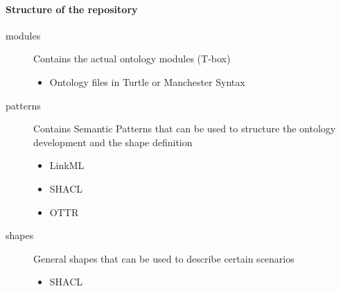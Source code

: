 \paragraph{Structure of the repository}

\begin{description}
    \item[modules] Contains the actual ontology modules (T-box)
    \begin{itemize}
        \item Ontology files in Turtle or Manchester Syntax
    \end{itemize}
    \item[patterns] Contains Semantic Patterns that can be used to structure the ontology development and the shape definition
    \begin{itemize}
        \item LinkML
        \item SHACL
        \item OTTR
    \end{itemize}
    \item[shapes] General shapes that can be used to describe certain scenarios
    \begin{itemize}
        \item SHACL
    \end{itemize}
\end{description}

